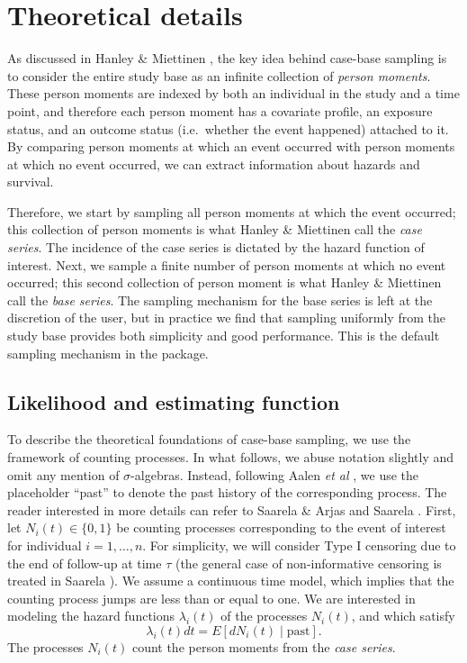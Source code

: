 \hypertarget{theory}{%
\section{Theoretical details}\label{theory}}

As discussed in Hanley \& Miettinen \citeyearpar{hanley2009fitting}, the
key idea behind case-base sampling is to consider the entire study base
as an infinite collection of \emph{person moments}. These person moments
are indexed by both an individual in the study and a time point, and
therefore each person moment has a covariate profile, an exposure
status, and an outcome status (i.e.~whether the event happened) attached
to it. By comparing person moments at which an event occurred with
person moments at which no event occurred, we can extract information
about hazards and survival.

Therefore, we start by sampling all person moments at which the event
occurred; this collection of person moments is what Hanley \& Miettinen
call the \emph{case series}. The incidence of the case series is
dictated by the hazard function of interest. Next, we sample a finite
number of person moments at which no event occurred; this second
collection of person moment is what Hanley \& Miettinen call the
\emph{base series}. The sampling mechanism for the base series is left
at the discretion of the user, but in practice we find that sampling
uniformly from the study base provides both simplicity and good
performance. This is the default sampling mechanism in the package.

\hypertarget{likelihood-and-estimating-function}{%
\subsection{Likelihood and estimating
function}\label{likelihood-and-estimating-function}}

To describe the theoretical foundations of case-base sampling, we use
the framework of counting processes. In what follows, we abuse notation
slightly and omit any mention of \(\sigma\)-algebras. Instead, following
Aalen \textit{et al} \citeyearpar{aalen2008survival}, we use the
placeholder ``past'' to denote the past history of the corresponding
process. The reader interested in more details can refer to Saarela \&
Arjas \citeyearpar{saarela2015non} and Saarela
\citeyearpar{saarela2016case}. First, let \(N_{i}(t) \in \{0, 1\}\) be
counting processes corresponding to the event of interest for individual
\(i=1, \ldots,n\). For simplicity, we will consider Type I censoring due
to the end of follow-up at time \(\tau\) (the general case of
non-informative censoring is treated in Saarela
\citeyearpar{saarela2016case}). We assume a continuous time model, which
implies that the counting process jumps are less than or equal to one.
We are interested in modeling the hazard functions \(\lambda_{i}(t)\) of
the processes \(N_i(t)\), and which satisfy
\[\lambda_{i}(t) dt = E[dN_{i}(t)\mid \mathrm{past}].\] The processes
\(N_i(t)\) count the person moments from the \emph{case series}.

